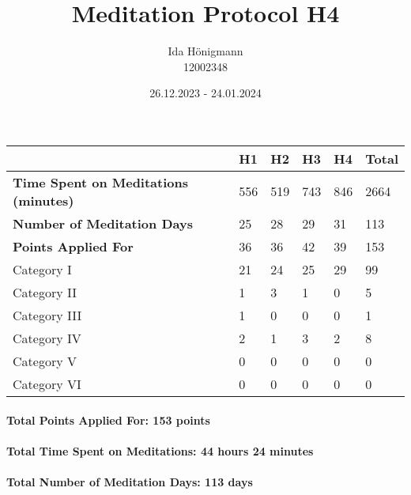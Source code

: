 \documentclass[11pt,a4paper]{article}
\begin{document}
\afterpage{\restorepagecolor}
\title{\LARGE\bfseries Meditation Protocol H4}
\author{Ida Hönigmann \\ 12002348}
\date{26.12.2023 - 24.01.2024}
\maketitle

\begin{tabular}{l|l|l|l|l|l}
	                                             &\textbf{H1}&\textbf{H2}&\textbf{H3}&\textbf{H4}&\textbf{Total}\\
	\hline
	\textbf{Time Spent on Meditations (minutes)} &556        &519        &743        &846        &2664          \\
	\textbf{Number of Meditation Days}           &25         &28         &29         &31         &113           \\
	\textbf{Points Applied For}                  &36         &36         &42         &39         &153           \\
	\hline
	Category I                                   &21         &24         &25         &29         &99            \\
	Category II                                  &1          &3          &1          &0          &5             \\
	Category III                                 &1          &0          &0          &0          &1             \\
	Category IV                                  &2          &1          &3          &2          &8             \\
	Category V                                   &0          &0          &0          &0          &0             \\
	Category VI                                  &0          &0          &0          &0          &0             \\
\end{tabular}

\paragraph{Total Points Applied For: 153 points}
\paragraph{Total Time Spent on Meditations: 44 hours 24 minutes}
\paragraph{Total Number of Meditation Days: 113 days}
\end{document}
